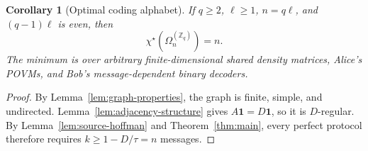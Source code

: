 \documentclass[11pt,a4paper]{article}
\numberwithin{equation}{section}
\numberwithin{figure}{section}
\numberwithin{table}{section}
\numberwithin{footnote}{section}
\newtheorem{corollary}[theorem]{Corollary}
\theoremstyle{informal}\newtheorem*{informaltheorem}{Informal theorem}
\theoremstyle{definition}\newtheorem{example}{Example}[section]
\theoremstyle{remark}\newtheorem{remark}[theorem]{Remark}
\newcommand{\Z}{\mathbb Z}
\newcommand{\one}{\mathbf 1}
\newcommand{\chs}{\chi^{\star}}
\newcommand{\Om}{\Omega_n^{(\Z_q)}}
\begin{document}
\begin{corollary}[Optimal coding alphabet]\label{cor:source-coding}
If \(q\geq2\), \(\ell\geq1\), \(n=q\ell\), and
\((q-1)\ell\) is even, then
\begin{equation}
 \chs(\Om)=n.
\end{equation}
The minimum is over arbitrary finite-dimensional shared density
matrices, Alice's POVMs, and Bob's message-dependent binary decoders.
\end{corollary}
\begin{proof}
By Lemma~\ref{lem:graph-properties}, the graph is finite, simple,
and undirected. Lemma~\ref{lem:adjacency-structure} gives
\(A\one=D\one\), so it is \(D\)-regular.
By Lemma~\ref{lem:source-hoffman} and Theorem~\ref{thm:main}, every
perfect protocol therefore requires \(k\geq1-D/\tau=n\) messages.


\end{proof}
\end{document}
